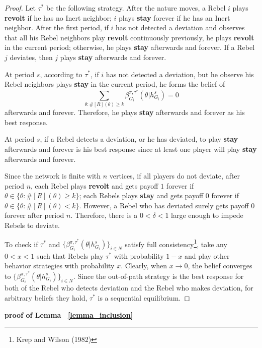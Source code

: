 \documentclass[12pt,letter]{article}
\newtheorem*{lemma*}{Lemma}
\theoremstyle{definition}
\theoremstyle{remark}
\theoremstyle{claim}
\begin{document}
\begin{proof}
Let $\tau^{*}$ be the following strategy. After the nature moves, a Rebel $i$ plays \textbf{revolt} if he has no Inert neighbor; $i$ plays \textbf{stay} forever if he has an Inert neighbor. After the first period, if $i$ has not detected a deviation and observes that all his Rebel neighbors play \textbf{revolt} continuously previously, he plays \textbf{revolt} in the current period; otherwise, he plays \textbf{stay} afterwards and forever. If a Rebel $j$ deviates, then $j$ plays \textbf{stay} afterwards and forever.

At period $s$, according to $\tau^{*}$, if $i$ has not detected a deviation, but he observe his Rebel neighbors plays \textbf{stay} in the current period, he forms the belief of \[\sum_{\theta:\#[R](\theta)\geq k}\beta^{\pi,\tau^*}_{G_i}(\theta|h^{s}_{G_i})=0\] afterwards and forever. Therefore, he plays \textbf{stay} afterwards and forever as his best response. 

At period $s$, if a Rebel detects a deviation, or he has deviated, to play \textbf{stay} afterwards and forever is his best response since at least one player will play \textbf{stay} afterwards and forever. 

Since the network is finite with $n$ vertices, if all players do not deviate, after period $n$, each Rebel plays \textbf{revolt} and gets payoff $1$ forever if $\theta\in \{\theta: \#[R](\theta)\geq k\}$; each Rebels plays \textbf{stay} and gets payoff $0$ forever if $\theta\in \{\theta: \#[R](\theta)< k\}$. However, a Rebel who has deviated surely gets payoff $0$ forever after period $n$. Therefore, there is a $0<\delta<1$ large enough to impede Rebels to deviate.

To check if $\tau^{*}$ and $\{\beta^{\pi,\tau^*}_{G_i}(\theta|h^{s}_{G_i})\}_{i\in N}$ satisfy full consistency\footnote{Krep and Wilson (1982)}, take any $0<x<1$ such that Rebels play $\tau^{*}$ with probability $1-x$ and play other behavior strategies with probability $x$. Clearly, when $x \rightarrow 0$, the belief converges to $\{\beta^{\pi,\tau^*}_{G_i}(\theta|h^{s}_{G_i})\}_{i\in N}$. Since the out-of-path strategy is the best response for both of the Rebel who detects deviation and the Rebel who makes deviation, for arbitrary beliefs they hold, $\tau^{*}$ is a sequential equilibrium.
\end{proof}
%
%
\bigskip
\noindent\textbf{proof of Lemma ~\ref{lemma_inclusion}}
\end{document}
